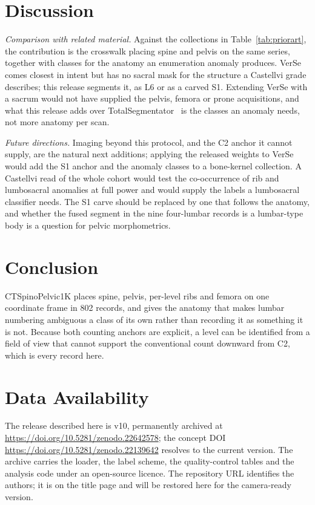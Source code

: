 \documentclass[aapm,mph,amsmath,amssymb,reprint]{revtex4-2}
\newcommand{\datasetdoi}{10.5281/zenodo.22139642}
\newcommand{\datasetversiondoi}{10.5281/zenodo.22642578}
\newcommand{\datasetversion}{v10}
\newif\ifreview \reviewtrue
\newcommand{\doiurl}[1]{\url{https://doi.org/#1}}
\begin{document}
\section{Discussion}

\emph{Comparison with related material.} Against the collections in
Table~\ref{tab:priorart}, the contribution is the crosswalk placing spine and pelvis on the
same series, together with classes for the anatomy an enumeration anomaly produces.
VerSe~\cite{verse2021,versedata2021} comes closest in intent but has no sacral mask for the
structure a Castellvi grade describes; this release segments it, as L6 or as a carved S1.
Extending VerSe with a sacrum would not have supplied the pelvis, femora or prone
acquisitions, and what this release adds over TotalSegmentator~\cite{totalsegmentator} is
the classes an anomaly needs, not more anatomy per scan.

\emph{Future directions.} Imaging beyond this protocol, and the C2 anchor it cannot
supply, are the natural next additions; applying the released weights to VerSe would add the
S1 anchor and the anomaly classes to a bone-kernel collection. A Castellvi read of the whole
cohort would test the co-occurrence of rib and lumbosacral anomalies at full power and would
supply the labels a lumbosacral classifier needs. The S1 carve should be replaced by one
that follows the anatomy, and whether the fused segment in the nine four-lumbar records is a
lumbar-type body is a question for pelvic morphometrics.

\section{Conclusion}

CTSpinoPelvic1K places spine, pelvis, per-level ribs and femora on one coordinate frame in
802 records, and gives the anatomy that makes lumbar numbering ambiguous a class of its own
rather than recording it as something it is not. Because both counting anchors are explicit,
a level can be identified from a field of view that cannot support the conventional count
downward from C2, which is every record here.

\section*{Data Availability}
The release described here is \datasetversion{}, permanently archived at
\doiurl{\datasetversiondoi}; the concept DOI \doiurl{\datasetdoi} resolves to the
current version.
The archive carries the loader, the label scheme, the quality-control tables and the
analysis code under an open-source licence. \ifreview The repository URL identifies the authors; it
is on the title page and will be restored here for the camera-ready version.\else Code:
\url{https://github.com/OpenSpineConsortium/CTSpinoPelvic1K}; convenience mirror:
\url{https://huggingface.co/datasets/OpenSpineConsortium/CTSpinoPelvic1K}.\fi
\end{document}
